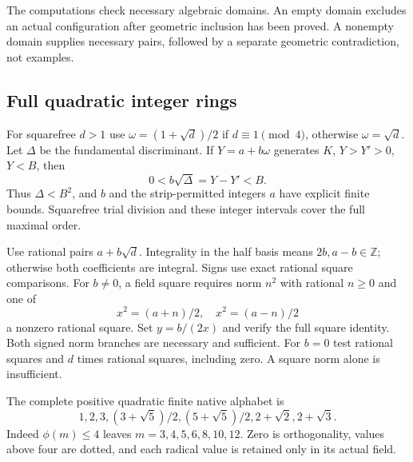 \documentclass[11pt]{article}
\newcommand{\ZZ}{\mathbb Z}
\begin{document}
The computations check necessary algebraic domains. An empty domain
excludes an actual configuration after geometric inclusion has been
proved. A nonempty domain supplies necessary pairs, followed by a
separate geometric contradiction, not examples.

\subsection{Full quadratic integer rings}
For squarefree $d>1$ use $\omega=(1+\sqrt d)/2$ if
$d\equiv1\pmod4$, otherwise $\omega=\sqrt d$.
Let $\Delta$ be the fundamental discriminant.
If $Y=a+b\omega$ generates $K$, $Y>Y'>0$, $Y<B$, then
\[
 0<b\sqrt\Delta=Y-Y'<B.
\]
Thus $\Delta<B^2$, and $b$ and the strip-permitted integers $a$
have explicit finite bounds. Squarefree trial division and these
integer intervals cover the full maximal order.

Use rational pairs $a+b\sqrt d$. Integrality in the half basis means
$2b,a-b\in\ZZ$; otherwise both coefficients are integral.
Signs use exact rational square comparisons.
For $b\ne0$, a field square requires norm $n^2$ with rational
$n\ge0$ and one of
\[
 x^2=(a+n)/2,\quad x^2=(a-n)/2
\]
a nonzero rational square. Set $y=b/(2x)$ and verify the full
square identity. Both signed norm branches are necessary and
sufficient. For $b=0$ test rational squares and $d$ times rational
squares, including zero. A square norm alone is insufficient.

The complete positive quadratic finite native alphabet is
\[
 1,2,3,(3+\sqrt5)/2,(5+\sqrt5)/2,2+\sqrt2,2+\sqrt3.
\]
Indeed $\phi(m)\le4$ leaves $m=3,4,5,6,8,10,12$.
Zero is orthogonality, values above four are dotted, and each
radical value is retained only in its actual field.
\end{document}
